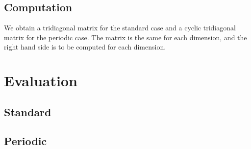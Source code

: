 \documentclass[aps,onecolumn]{revtex4}
\begin{document}
\subsection{Computation}
We obtain a tridiagonal matrix for the standard case and a cyclic tridiagonal matrix for the periodic case.
The matrix is the same for each dimension, and the right hand side is to be computed for each dimension.

\section{Evaluation}
\subsection{Standard}


\subsection{Periodic}
\end{document}
